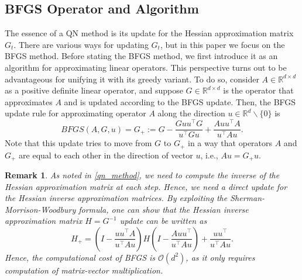 \documentclass[11pt]{article}
\numberwithin{assumption}{section}
\newtheorem{remark}{Remark}
\numberwithin{remark}{section}
\numberwithin{theorem}{section}
\begin{document}
\subsection{BFGS Operator and Algorithm}\label{sec:standard_BFGS}

The essence of a QN method is its update for the Hessian approximation matrix $G_t$. There are various ways for updating $G_t$, but in this paper we focus on the BFGS method. Before stating the BFGS method, we first introduce it as an algorithm for approximating linear operators. This perspective turns out to be advantageous for unifying it with its greedy variant. To do so, consider $ A \in \mathbb{R}^{d \times d}$ as a positive
definite linear operator, and suppose $ G \in \mathbb{R}^{d \times d}$ is the operator that approximates $A$ and is updated according to the BFGS update. Then, the BFGS update rule for approximating operator $A$ along the direction $u \in \mathbb{R}^{d}\backslash\{0\}$ is 
\begin{equation}\label{BFGS_update}
    BFGS(A, G, u) = G_+ := G - \frac{G u u^\top G}{u^\top G u} + \frac{A u u^\top A}{u^\top A u}.
\end{equation}
Note that this update tries to move from $G$ to $G_+$ in a way that operators $A$ and $G_+$ are equal to each other in the direction of vector $u$, i.e., $Au=G_+u$.

\begin{remark}\label{remark_1}
As noted in \eqref{qn_method}, we need to compute the inverse of the Hessian approximation matrix at each step. Hence, we need a direct update for the Hessian inverse approximation matrices. By exploiting the Sherman-Morrison-Woodbury formula, one can show that the Hessian inverse approximation matrix $H = G^{-1}$ update can be written as
\begin{equation}\label{BFGS_inverse_update}
    H_+ = \left(I-\frac{u u^\top A}{u^\top Au}\right) H \left(I-\frac{ Au u^\top}{u^\top Au}\right) +\frac{u u^\top}{u^\top Au}.
\end{equation}
Hence, the computational cost of BFGS is $\mathcal{O}(d^2)$, as it only requires computation of matrix-vector multiplication.
\end{remark}
\end{document}

